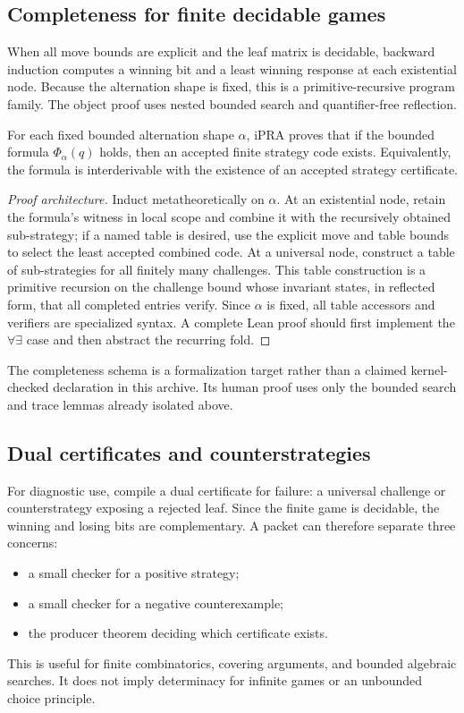 \subsection{Completeness for finite decidable games}

When all move bounds are explicit and the leaf matrix is decidable, backward
induction computes a winning bit and a least winning response at each
existential node.  Because the alternation shape is fixed, this is a
primitive-recursive program family.  The object proof uses nested bounded
search and quantifier-free reflection.

\begin{theorem}
For each fixed bounded alternation shape \(\alpha\), iPRA proves that if the
bounded formula \(\Phi_\alpha(q)\) holds, then an accepted finite strategy code
exists.  Equivalently, the formula is interderivable with the existence of an
accepted strategy certificate.
\end{theorem}

\begin{proof}[Proof architecture]
Induct metatheoretically on \(\alpha\).  At an existential node, retain the
formula's witness in local scope and combine it with the recursively obtained
sub-strategy; if a named table is desired, use the explicit move and table
bounds to select the least accepted combined code.  At a universal node,
construct a table of sub-strategies for all finitely many challenges.  This
table construction is a primitive recursion on the challenge bound whose
invariant states, in reflected form, that all completed entries verify.  Since
\(\alpha\) is fixed, all table accessors and verifiers are specialized syntax.
A complete Lean proof should first implement the \(\forall\exists\) case and
then abstract the recurring fold.
\end{proof}

The completeness schema is a formalization target rather than a claimed
kernel-checked declaration in this archive.  Its human proof uses only the
bounded search and trace lemmas already isolated above.

\subsection{Dual certificates and counterstrategies}

For diagnostic use, compile a dual certificate for failure: a universal
challenge or counterstrategy exposing a rejected leaf.  Since the finite game
is decidable, the winning and losing bits are complementary.  A packet can
therefore separate three concerns:
\begin{itemize}
\item a small checker for a positive strategy;
\item a small checker for a negative counterexample;
\item the producer theorem deciding which certificate exists.
\end{itemize}
This is useful for finite combinatorics, covering arguments, and bounded
algebraic searches.  It does not imply determinacy for infinite games or an
unbounded choice principle.
